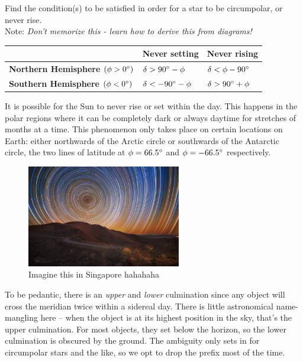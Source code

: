 \documentclass{article}
\begin{document}
\begin{Exercise}
Find the condition(s) to be satisfied in order for a star to be circumpolar, or never rise. \\
Note: \textit{Don't memorize this - learn how to derive this from diagrams!}
\end{Exercise}
\begin{Answer}
    \begin{table}[h]
        \begin{tabular}{|l|l|l|}
        \hline
         & \textbf{Never setting} & \textbf{Never rising} \\ \hline
        \textbf{Northern Hemisphere} $(\phi > 0{}^{\circ})$ & $\delta > 90{}^{\circ} - \phi$ & $\delta < \phi - 90{}^{\circ}$ \\ \hline
        \textbf{Southern Hemisphere} $(\phi < 0{}^{\circ})$ & $\delta < -90{}^{\circ} - \phi$ & $\delta > 90{}^{\circ} + \phi$ \\ \hline
        \end{tabular}
    \end{table}
\end{Answer}

It is possible for the Sun to never rise or set within the day. This happens in the polar regions where it can be completely dark or always daytime for stretches of months at a time. This phenomenon only takes place on certain locations on Earth: either northwards of the Arctic circle or southwards of the Antarctic circle, the two lines of latitude at $\phi = 66.5{}^{\circ}$ and $\phi = -66.5{}^{\circ}$ respectively.

\begin{figure}[h]
    \centering
    \includegraphics[width=0.6\textwidth]{img/startrails.jpg}
    \caption{Imagine this in Singapore hahahaha}
    \label{fig:star_trail}
\end{figure}

To be pedantic, there is an \textit{upper} and \textit{lower} culmination since any object will cross the meridian twice within a sidereal day. There is little astronomical name-mangling here -- when the object is at its highest position in the sky, that's the upper culmination. For most objects, they set below the horizon, so the lower culmination is obscured by the ground. The ambiguity only sets in for circumpolar stars and the like, so we opt to drop the prefix most of the time.
\end{document}
